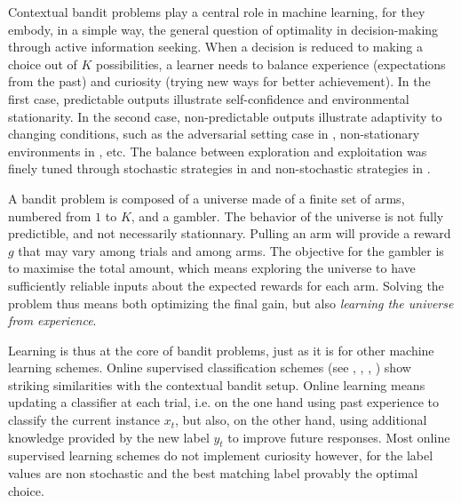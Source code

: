 \documentclass[preprint,12pt,authoryear]{elsarticle}
\begin{document}
Contextual bandit problems play a central role in machine learning, for they embody, in a simple way, the general question of optimality in decision-making through active  information seeking. When a decision is reduced to making a choice out of $K$ possibilities, a learner needs to balance experience (expectations from the past) and curiosity (trying new ways for better achievement). In the first case, predictable outputs illustrate self-confidence and environmental stationarity. In the second case, non-predictable outputs illustrate adaptivity to changing conditions, such as the adversarial setting case in \cite{auer1995gambling}, non-stationary environments in  \cite{kivinen2004online}, etc. The balance between exploration and exploitation was finely tuned through stochastic strategies in \cite{auer2003nonstochastic} and non-stochastic strategies in \cite{auer2002finite}. 

A bandit problem is composed of a universe made of a finite set of arms, numbered from $1$ to $K$, and a gambler. The behavior of the universe is not fully predictible, and not necessarily stationnary. Pulling an arm will provide a reward $g$ that may vary among trials and among arms. The objective for the gambler is to maximise the total amount, which means exploring the universe to have sufficiently reliable inputs about the expected rewards for each arm. Solving the problem thus means both optimizing the final gain, but also \emph{learning the universe from experience}.    

Learning is thus at the core of bandit problems, just as it is for other machine learning schemes. 
Online supervised classification schemes (see \cite{freund1997decision}, \cite{cesa2005second}, \cite{kivinen2004online}, \cite{crammer2006online}) show striking similarities with the contextual bandit setup. Online learning means updating a classifier at each trial, i.e. on the one hand using past experience to classify the current instance $x_t$, but also, on the other hand, using additional knowledge provided by the new label $y_t$ to improve future responses. Most online supervised learning schemes do not implement curiosity however, for the label values are non stochastic and the best matching label provably the optimal choice. 


\end{document}

